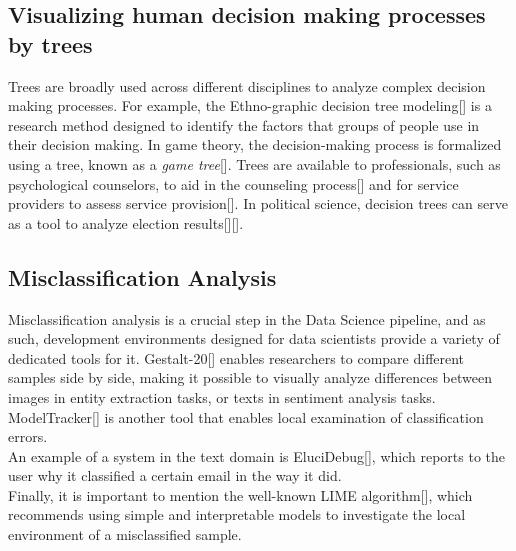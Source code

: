 \documentclass[11pt]{article}
\begin{document}
\subsection{Visualizing human decision making processes by trees
}\label{Visualizing human decision making processes by trees}

Trees are broadly used across different disciplines to analyze complex decision making processes. For example, the Ethno-graphic decision tree modeling[] is a research method designed to identify the factors that groups of people use in their decision making. In game theory, the decision-making process is formalized using a tree, known as a \textit{game tree}[]. Trees are available to professionals, such as psychological counselors, to aid in the counseling process[] and for service providers to assess service provision[]. In political science, decision trees can serve as a tool to analyze election results[][].

\subsection{Misclassification Analysis}\label{Misclassification Analysis
}
Misclassification analysis is a crucial step in the Data Science pipeline, and as such, development environments designed for data scientists provide a variety of dedicated tools for it. Gestalt-20[] enables researchers to compare different samples side by side, making it possible to visually analyze differences between images in entity extraction tasks, or texts in sentiment analysis tasks. ModelTracker[] is another tool that enables local examination of classification errors.\\
An example of a system in the text domain is EluciDebug[], which reports to the user why it classified a certain email in the way it did.\\
Finally, it is important to mention the well-known LIME algorithm[], which recommends using simple and interpretable models to investigate the local environment of a misclassified sample.
\end{document}
